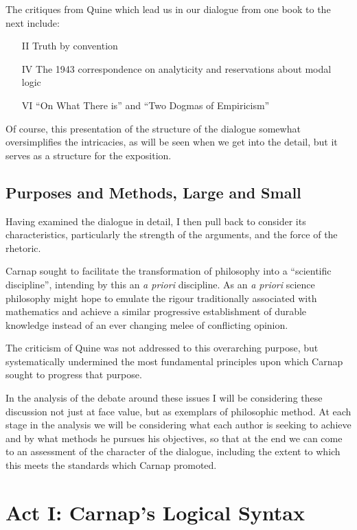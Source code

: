 The critiques from Quine which lead us in our dialogue from one
book to the next include:

\begin{itemize}
\item[II] Truth by convention \cite{quine36}
\item[IV] The 1943 correspondence on analyticity \cite{carnap90} and reservations about modal logic \cite{quine43,quine47}
\item[VI] ``On What There is'' \cite{quine51} and ``Two Dogmas of Empiricism'' \cite{quine51b}
\end{itemize}

Of course, this presentation of the structure of the dialogue somewhat oversimplifies
the intricacies, as will be seen when we get into the detail, but it serves
as a structure for the exposition.

\subsection{Purposes and Methods, Large and Small}

Having examined the dialogue in detail, I then pull back to consider its characteristics,
particularly the strength of the arguments, and the force of the rhetoric.

Carnap sought to facilitate the transformation of philosophy into a ``scientific discipline'', intending by this an \emph{a priori} discipline.
As an \emph{a priori} science philosophy might hope to emulate the rigour traditionally associated with mathematics and achieve a similar progressive establishment of durable knowledge instead of an ever changing melee of conflicting opinion.

The criticism of Quine was not addressed to this overarching purpose, but systematically undermined the most fundamental principles upon which Carnap sought to progress that purpose.

In the analysis of the debate around these issues I will be considering these discussion not just at face value, but as exemplars of philosophic method.
At each stage in the analysis we will be considering what each author is seeking to achieve and by what methods he pursues his objectives, so that at the end we can come to an assessment of the character of the dialogue, including the extent to which this meets the standards which Carnap promoted.


\section{Act I: Carnap's Logical Syntax}

